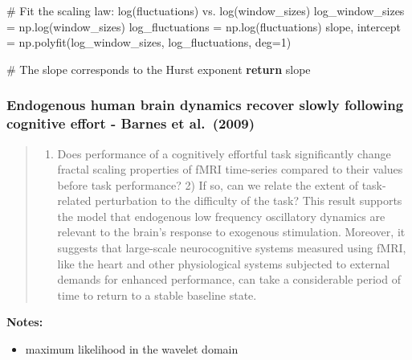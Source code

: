 \documentclass[
  sn-vancouver,
  Numbered,
  referee,
  lineno]{sn-jnl}
\newenvironment{Shaded}{\begin{snugshade}}{\end{snugshade}}
\newcommand{\CommentTok}[1]{\textcolor[rgb]{0.37,0.37,0.37}{#1}}
\newcommand{\ControlFlowTok}[1]{\textcolor[rgb]{0.00,0.23,0.31}{\textbf{#1}}}
\newcommand{\DecValTok}[1]{\textcolor[rgb]{0.68,0.00,0.00}{#1}}
\newcommand{\NormalTok}[1]{\textcolor[rgb]{0.00,0.23,0.31}{#1}}
\newcommand{\OperatorTok}[1]{\textcolor[rgb]{0.37,0.37,0.37}{#1}}
\providecommand{\tightlist}{%
  \setlength{\itemsep}{0pt}\setlength{\parskip}{0pt}}\usepackage{longtable,booktabs,array}
\begin{document}
\begin{Shaded}
\begin{Highlighting}[]
    \CommentTok{\# Fit the scaling law: log(fluctuations) vs. log(window\_sizes)}
\NormalTok{    log\_window\_sizes }\OperatorTok{=}\NormalTok{ np.log(window\_sizes)}
\NormalTok{    log\_fluctuations }\OperatorTok{=}\NormalTok{ np.log(fluctuations)}
\NormalTok{    slope, intercept }\OperatorTok{=}\NormalTok{ np.polyfit(log\_window\_sizes, log\_fluctuations, deg}\OperatorTok{=}\DecValTok{1}\NormalTok{)}
    
    \CommentTok{\# The slope corresponds to the Hurst exponent}
    \ControlFlowTok{return}\NormalTok{ slope}
\end{Highlighting}
\end{Shaded}

\subsubsection{\texorpdfstring{Endogenous human brain dynamics recover
slowly following cognitive effort - Barnes et al.~(2009)
\citep{barnesEndogenousHumanBrain2009}}{Endogenous human brain dynamics recover slowly following cognitive effort - Barnes et al.~(2009) {[}@barnesEndogenousHumanBrain2009{]}}}\label{endogenous-human-brain-dynamics-recover-slowly-following-cognitive-effort---barnes-et-al.-2009-barnesendogenoushumanbrain2009-1}

\begin{quote}
\begin{enumerate}
\def\labelenumi{\arabic{enumi})}
\tightlist
\item
  Does performance of a cognitively effortful task significantly change
  fractal scaling properties of fMRI time-series compared to their
  values before task performance? 2) If so, can we relate the extent of
  task-related perturbation to the difficulty of the task? This result
  supports the model that endogenous low frequency oscillatory dynamics
  are relevant to the brain's response to exogenous stimulation.
  Moreover, it suggests that large-scale neurocognitive systems measured
  using fMRI, like the heart and other physiological systems subjected
  to external demands for enhanced performance, can take a considerable
  period of time to return to a stable baseline state.
\end{enumerate}
\end{quote}

\textbf{Notes:}

\begin{itemize}
\tightlist
\item
  maximum likelihood in the wavelet domain
\end{itemize}
\end{document}
